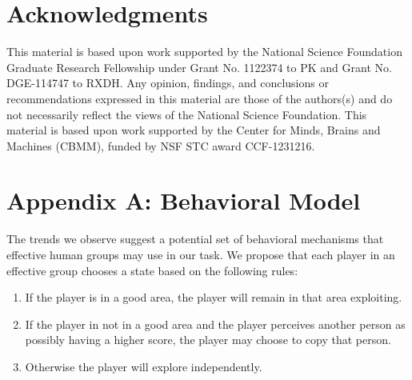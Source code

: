 \documentclass[12pt,letterpaper]{article}
\begin{document}
\section{Acknowledgments}

\small

This material is based upon work supported by the National Science
Foundation Graduate Research Fellowship under Grant No. 1122374 to PK
and Grant No. DGE-114747 to RXDH. Any opinion, findings, and
conclusions or recommendations expressed in this material are those of
the authors(s) and do not necessarily reflect the views of the
National Science Foundation.  This material is based upon work
supported by the Center for Minds, Brains and Machines (CBMM), funded
by NSF STC award CCF-1231216.




\setlength{\bibleftmargin}{.125in}
\setlength{\bibindent}{-\bibleftmargin}

\small{
  
}


\section*{Appendix A: Behavioral Model}

The trends we observe suggest a potential set of behavioral mechanisms
that effective human groups may use in our task.  We propose that each
player in an effective group chooses a state based on the following
rules:
\begin{enumerate}
\item
  If the player is in a good area, the player will remain in that area
  exploiting.
\item
  If the player in not in a good area and the player perceives another
  person as possibly having a higher score, the player may choose to
  copy that person.
\item
  Otherwise the player will explore independently.
\end{enumerate}
\end{document}
